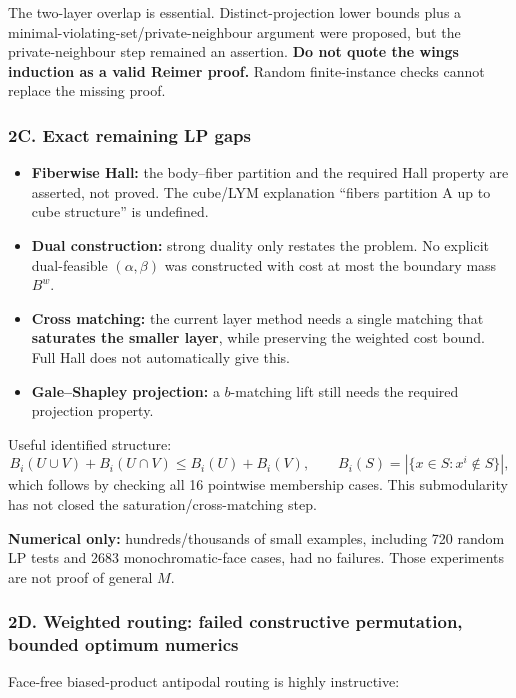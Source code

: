 The two-layer overlap is essential. Distinct-projection lower bounds plus a minimal-violating-set/private-neighbour argument were proposed, but the private-neighbour step remained an assertion. \textbf{Do not quote the wings induction as a valid Reimer proof.} Random finite-instance checks cannot replace the missing proof.

\subsubsection{2C. Exact remaining LP gaps}\label{c.-exact-remaining-lp-gaps}

\begin{itemize}
\tightlist
\item
  \textbf{Fiberwise Hall:} the body--fiber partition and the required Hall property are asserted, not proved. The cube/LYM explanation ``fibers partition A up to cube structure'' is undefined.
\item
  \textbf{Dual construction:} strong duality only restates the problem. No explicit dual-feasible \((\alpha,\beta)\) was constructed with cost at most the boundary mass \(B^w\).
\item
  \textbf{Cross matching:} the current layer method needs a single matching that \textbf{saturates the smaller layer}, while preserving the weighted cost bound. Full Hall does not automatically give this.
\item
  \textbf{Gale--Shapley projection:} a \(b\)-matching lift still needs the required projection property.
\end{itemize}

Useful identified structure:
\[B_i(U\cup V)+B_i(U\cap V)\le B_i(U)+B_i(V),
\qquad B_i(S)=|\{x\in S:x^i\notin S\}|,\]
which follows by checking all 16 pointwise membership cases. This submodularity has not closed the saturation/cross-matching step.

\textbf{Numerical only:} hundreds/thousands of small examples, including 720 random LP tests and 2683 monochromatic-face cases, had no failures. Those experiments are not proof of general \(M\).

\subsubsection{2D. Weighted routing: failed constructive permutation, bounded optimum numerics}\label{d.-weighted-routing-failed-constructive-permutation-bounded-optimum-numerics}

Face-free biased-product antipodal routing is highly instructive:

